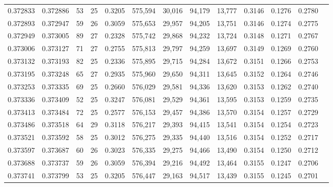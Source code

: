 \begin{tabular}{rrrrrrrrrrrrr}
0.372833 & 0.372886 &    53 &  25 &                                     0.3205 & 575,594 &  30,016 &  94,179 &  13,777 & 0.3146 & 0.1276 & 0.2780 \\
0.372893 & 0.372947 &    59 &  26 &                                     0.3059 & 575,653 &  29,957 &  94,205 &  13,751 & 0.3146 & 0.1274 & 0.2775 \\
0.372949 & 0.373005 &    89 &  27 &                                     0.2328 & 575,742 &  29,868 &  94,232 &  13,724 & 0.3148 & 0.1271 & 0.2767 \\
0.373006 & 0.373127 &    71 &  27 &                                     0.2755 & 575,813 &  29,797 &  94,259 &  13,697 & 0.3149 & 0.1269 & 0.2760 \\
0.373132 & 0.373193 &    82 &  25 &                                     0.2336 & 575,895 &  29,715 &  94,284 &  13,672 & 0.3151 & 0.1266 & 0.2753 \\
0.373195 & 0.373248 &    65 &  27 &                                     0.2935 & 575,960 &  29,650 &  94,311 &  13,645 & 0.3152 & 0.1264 & 0.2746 \\
0.373253 & 0.373335 &    69 &  25 &                                     0.2660 & 576,029 &  29,581 &  94,336 &  13,620 & 0.3153 & 0.1262 & 0.2740 \\
0.373336 & 0.373409 &    52 &  25 &                                     0.3247 & 576,081 &  29,529 &  94,361 &  13,595 & 0.3153 & 0.1259 & 0.2735 \\
0.373413 & 0.373484 &    72 &  25 &                                     0.2577 & 576,153 &  29,457 &  94,386 &  13,570 & 0.3154 & 0.1257 & 0.2729 \\
0.373486 & 0.373518 &    64 &  29 &                                     0.3118 & 576,217 &  29,393 &  94,415 &  13,541 & 0.3154 & 0.1254 & 0.2723 \\
0.373521 & 0.373592 &    58 &  25 &                                     0.3012 & 576,275 &  29,335 &  94,440 &  13,516 & 0.3154 & 0.1252 & 0.2717 \\
0.373597 & 0.373687 &    60 &  26 &                                     0.3023 & 576,335 &  29,275 &  94,466 &  13,490 & 0.3154 & 0.1250 & 0.2712 \\
0.373688 & 0.373737 &    59 &  26 &                                     0.3059 & 576,394 &  29,216 &  94,492 &  13,464 & 0.3155 & 0.1247 & 0.2706 \\
0.373741 & 0.373799 &    53 &  25 &                                     0.3205 & 576,447 &  29,163 &  94,517 &  13,439 & 0.3155 & 0.1245 & 0.2701 \\

\end{tabular}
